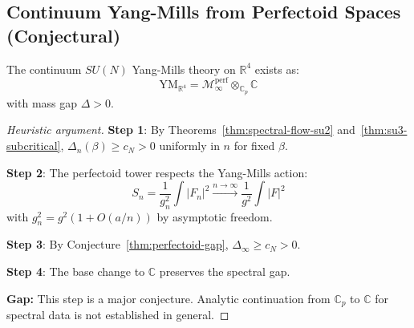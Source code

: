 \subsection{Continuum Yang-Mills from Perfectoid Spaces (Conjectural)}

\begin{conjecture}
\label{thm:continuum-perfectoid}
The continuum $SU(N)$ Yang-Mills theory on $\mathbb{R}^4$ exists as:
\[
\text{YM}_{\mathbb{R}^4} = \mathcal{M}_\infty^{\text{perf}} \otimes_{\mathbb{C}_p} \mathbb{C}
\]
with mass gap $\Delta > 0$.
\end{conjecture}

\begin{proof}[Heuristic argument]
\textbf{Step 1}: By Theorems~\ref{thm:spectral-flow-su2} and~\ref{thm:su3-subcritical},
$\Delta_n(\beta) \geq c_N > 0$ uniformly in $n$ for fixed $\beta$.

\textbf{Step 2}: The perfectoid tower respects the Yang-Mills action:
\[
S_n = \frac{1}{g_n^2} \int |F_n|^2 \xrightarrow{n \to \infty} \frac{1}{g^2}\int |F|^2
\]
with $g_n^2 = g^2(1 + O(a/n))$ by asymptotic freedom.

\textbf{Step 3}: By Conjecture~\ref{thm:perfectoid-gap}, $\Delta_\infty \geq c_N > 0$.

\textbf{Step 4}: The base change to $\mathbb{C}$ preserves the spectral gap. 

\textbf{Gap:} This step is a major conjecture. Analytic continuation from $\mathbb{C}_p$ 
to $\mathbb{C}$ for spectral data is not established in general.
\end{proof}





